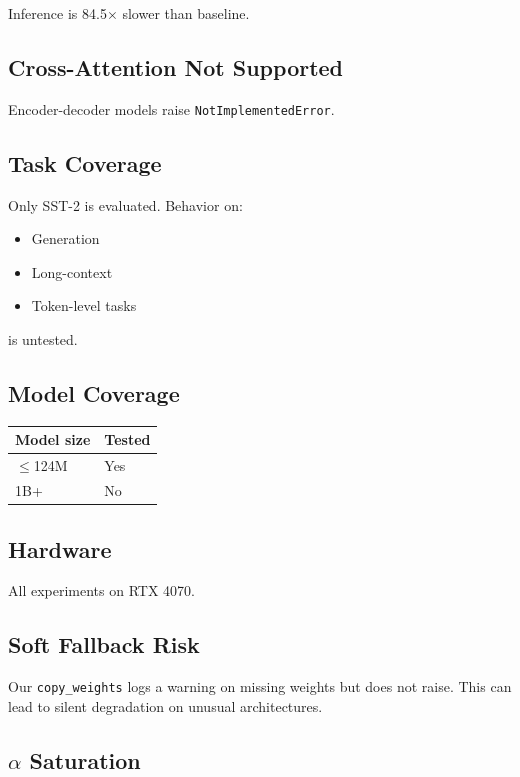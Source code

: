 Inference is 84.5$\times$ slower than baseline.

\subsection{Cross-Attention Not Supported}

Encoder-decoder models raise \texttt{NotImplementedError}.

\subsection{Task Coverage}

Only SST-2 is evaluated. Behavior on:
\begin{itemize}
\item Generation
\item Long-context
\item Token-level tasks

\end{itemize}
is untested.

\subsection{Model Coverage}

\begin{table}[H]
\centering
\small
\begin{tabular}{ll}
\toprule
\textbf{Model size} & \textbf{Tested} \\
\midrule
$\le$124M & Yes \\
1B+ & No \\
\bottomrule
\end{tabular}
\end{table}

\subsection{Hardware}

All experiments on RTX 4070.

\subsection{Soft Fallback Risk}

Our \texttt{copy\_weights} logs a warning on missing weights but does not raise. This 
can lead to silent degradation on unusual architectures.

\subsection{$\alpha$ Saturation}

